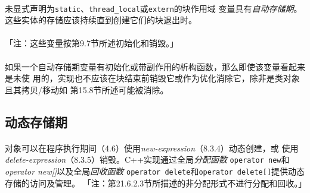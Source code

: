 \paragraph{}
未显式声明为\texttt{static}、\texttt{thread\_local}或\texttt{extern}的块作用域
变量具有\textit{自动存储期}。这些实体的存储应该持续直到创建它们的块退出时。

\paragraph{}
「注：这些变量按第9.7节所述初始化和销毁。」

\paragraph{}
如果一个自动存储期变量有初始化或带副作用的析构函数，那么即使该变量看起来是未使
用的，实现也不应该在块结束前销毁它或作为优化消除它，除非是类对象且其拷贝/移动如
第15.8节所述可能被消除。

\subsection{动态存储期}
\paragraph{}
对象可以在程序执行期间（4.6）使用\textit{new-expression}（8.3.4）动态创建，或
使用\textit{delete-expression}（8.3.5）销毁。C++实现通过全局\textit{分配函数}
\texttt{operator new}和\textit{operator new[]}以及全局\textit{回收函数}
\texttt{operator delete}和\texttt{operator delete[]}提供动态存储的访问及管理。
「注：第21.6.2.3节所描述的非分配形式不进行分配和回收。」

